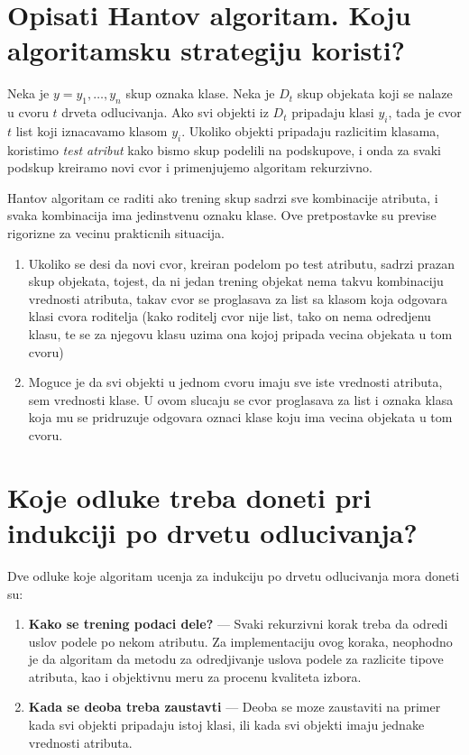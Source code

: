 \documentclass[a4paper]{article}
\begin{document}
\section{Opisati Hantov algoritam. Koju algoritamsku strategiju koristi?}
Neka je \(y = {y_1,\ldots,y_n}\) skup oznaka klase. Neka je \(D_t\) skup objekata koji se nalaze u
cvoru \(t\) drveta odlucivanja. Ako svi objekti iz \(D_t\) pripadaju klasi \(y_i\), tada je cvor
\(t\) list koji iznacavamo klasom \(y_i\). Ukoliko objekti pripadaju razlicitim klasama, koristimo
\emph{test atribut} kako bismo skup podelili na podskupove, i onda za svaki podskup kreiramo novi
cvor i primenjujemo algoritam rekurzivno.

Hantov algoritam ce raditi ako trening skup sadrzi sve kombinacije atributa, i svaka kombinacija ima
jedinstvenu oznaku klase. Ove pretpostavke su previse rigorizne za vecinu prakticnih situacija.
\begin{enumerate}
    \item Ukoliko se desi da novi cvor, kreiran podelom po test atributu, sadrzi prazan skup
        objekata, tojest, da ni jedan trening objekat nema takvu kombinaciju vrednosti atributa,
        takav cvor se proglasava za list sa klasom koja odgovara klasi cvora roditelja (kako
        roditelj cvor nije list, tako on nema odredjenu klasu, te se za njegovu klasu uzima ona
        kojoj pripada vecina objekata u tom cvoru)
    \item Moguce je da svi objekti u jednom cvoru imaju sve iste vrednosti atributa, sem vrednosti
        klase. U ovom slucaju se cvor proglasava za list i oznaka klasa koja mu se pridruzuje
        odgovara oznaci klase koju ima vecina objekata u tom cvoru.
\end{enumerate}

\section{Koje odluke treba doneti pri indukciji po drvetu odlucivanja?}
Dve odluke koje algoritam ucenja za indukciju po drvetu odlucivanja mora doneti su:
\begin{enumerate}
    \item \textbf{Kako se trening podaci dele?} --- Svaki rekurzivni korak treba da odredi uslov
        podele po nekom atributu. Za implementaciju ovog koraka, neophodno je da algoritam da metodu
        za odredjivanje uslova podele za razlicite tipove atributa, kao i objektivnu meru za procenu
        kvaliteta izbora.
    \item \textbf{Kada se deoba treba zaustavti} --- Deoba se moze zaustaviti na primer kada svi
        objekti pripadaju istoj klasi, ili kada svi objekti imaju jednake vrednosti atributa.
\end{enumerate}
\end{document}
